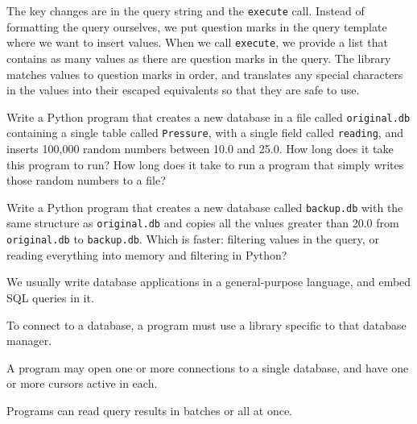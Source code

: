 The key changes are in the query string and the \texttt{execute} call.
Instead of formatting the query ourselves, we put question marks in the
query template where we want to insert values. When we call
\texttt{execute}, we provide a list that contains as many values as
there are question marks in the query. The library matches values to
question marks in order, and translates any special characters in the
values into their escaped equivalents so that they are safe to use.

\begin{challenge}
  Write a Python program that creates a new database in a file called
  \texttt{original.db} containing a single table called
  \texttt{Pressure}, with a single field called \texttt{reading}, and
  inserts 100,000 random numbers between 10.0 and 25.0. How long does it
  take this program to run? How long does it take to run a program that
  simply writes those random numbers to a file?
\end{challenge}

\begin{challenge}
  Write a Python program that creates a new database called
  \texttt{backup.db} with the same structure as \texttt{original.db} and
  copies all the values greater than 20.0 from \texttt{original.db} to
  \texttt{backup.db}. Which is faster: filtering values in the query, or
  reading everything into memory and filtering in Python?
\end{challenge}

\begin{keypoints}
\begin{swcitemize}
\item
  We usually write database applications in a general-purpose language,
  and embed SQL queries in it.
\item
  To connect to a database, a program must use a library specific to
  that database manager.
\item
  A program may open one or more connections to a single database, and
  have one or more cursors active in each.
\item
  Programs can read query results in batches or all at once.
\end{swcitemize}
\end{keypoints}
